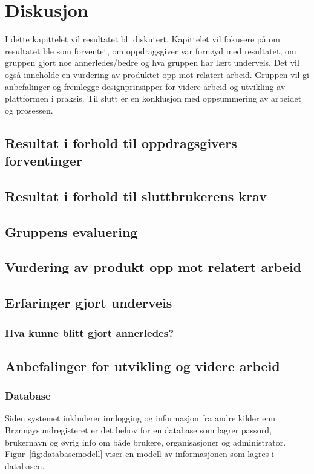 \cleardoublepage
\chapter{Diskusjon}
\label{chap:discussion} 

I dette kapittelet vil resultatet bli diskutert. Kapittelet vil fokusere på om resultatet ble som forventet, om oppdragsgiver var fornøyd med resultatet, om gruppen gjort noe annerledes/bedre og hva gruppen har lært underveis. Det vil også inneholde en vurdering av produktet opp mot relatert arbeid. Gruppen vil gi anbefalinger og fremlegge designprinsipper for videre arbeid og utvikling av plattformen i praksis. Til slutt er en konklusjon med oppsummering av arbeidet og prosessen.

\section{Resultat i forhold til oppdragsgivers forventinger}

\section{Resultat i forhold til sluttbrukerens krav}

\section{Gruppens evaluering}

\section{Vurdering av produkt opp mot relatert arbeid}

\section{Erfaringer gjort underveis}
\subsection{Hva kunne blitt gjort annerledes?}

\section{Anbefalinger for utvikling og videre arbeid}
\label{section:anbefaling-videre-utvikling}
\subsection{Database}
Siden systemet inkluderer innlogging og informasjon fra andre kilder enn Brønnøysundregisteret er det behov for en database som lagrer passord, brukernavn og øvrig info om både brukere, organisasjoner og administrator. Figur~\ref{fig:databasemodell} viser en modell av informasjonen som lagres i databasen.

